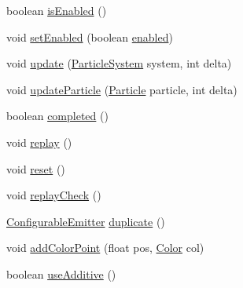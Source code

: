 \begin{DoxyCompactItemize}
boolean \mbox{\hyperlink{classorg_1_1newdawn_1_1slick_1_1particles_1_1_configurable_emitter_a2e85f026589d4cd80c64dd3e983461fc}{is\+Enabled}} ()
\item 
void \mbox{\hyperlink{classorg_1_1newdawn_1_1slick_1_1particles_1_1_configurable_emitter_a7a8a0b2b5f5ecbe56ef46310a219a45b}{set\+Enabled}} (boolean \mbox{\hyperlink{classorg_1_1newdawn_1_1slick_1_1particles_1_1_configurable_emitter_a946084290596958350688f1e02b6e611}{enabled}})
\item 
void \mbox{\hyperlink{classorg_1_1newdawn_1_1slick_1_1particles_1_1_configurable_emitter_a982eeb3a795db37d7065e8b20868281c}{update}} (\mbox{\hyperlink{classorg_1_1newdawn_1_1slick_1_1particles_1_1_particle_system}{Particle\+System}} system, int delta)
\item 
void \mbox{\hyperlink{classorg_1_1newdawn_1_1slick_1_1particles_1_1_configurable_emitter_afb381373acb3d59327528045c126d0fb}{update\+Particle}} (\mbox{\hyperlink{classorg_1_1newdawn_1_1slick_1_1particles_1_1_particle}{Particle}} particle, int delta)
\item 
boolean \mbox{\hyperlink{classorg_1_1newdawn_1_1slick_1_1particles_1_1_configurable_emitter_abcb8dd0c86a998fc1f386254e4a27c86}{completed}} ()
\item 
void \mbox{\hyperlink{classorg_1_1newdawn_1_1slick_1_1particles_1_1_configurable_emitter_a86bf563a92e8c12e4390f822e872c696}{replay}} ()
\item 
void \mbox{\hyperlink{classorg_1_1newdawn_1_1slick_1_1particles_1_1_configurable_emitter_a6aeb253b52df08647d4f1f6710b76cbe}{reset}} ()
\item 
void \mbox{\hyperlink{classorg_1_1newdawn_1_1slick_1_1particles_1_1_configurable_emitter_af6c9f05ac6c5323c4f29d9bc6d5d1228}{replay\+Check}} ()
\item 
\mbox{\hyperlink{classorg_1_1newdawn_1_1slick_1_1particles_1_1_configurable_emitter}{Configurable\+Emitter}} \mbox{\hyperlink{classorg_1_1newdawn_1_1slick_1_1particles_1_1_configurable_emitter_a51ddc0c165c190bdc7ea2094d7be2021}{duplicate}} ()
\item 
void \mbox{\hyperlink{classorg_1_1newdawn_1_1slick_1_1particles_1_1_configurable_emitter_a9d52903ab1f464fe71e8a1afc8d22f53}{add\+Color\+Point}} (float pos, \mbox{\hyperlink{classorg_1_1newdawn_1_1slick_1_1_color}{Color}} col)
\item 
boolean \mbox{\hyperlink{classorg_1_1newdawn_1_1slick_1_1particles_1_1_configurable_emitter_a417f9091bafd99eaed6984b22190b798}{use\+Additive}} ()
\item 

\end{DoxyCompactItemize}
